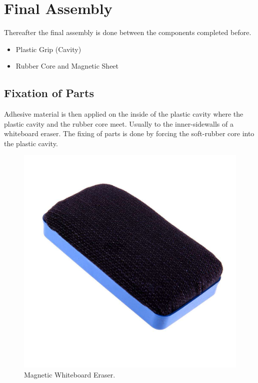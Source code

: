 \documentclass[12pt,a4paper,oneside]{article}
\begin{document}
\newpage

\section{Final Assembly}
Thereafter the final assembly is done between the components completed before.
\begin{itemize}
    \item Plastic Grip (Cavity)
    \item Rubber Core and Magnetic Sheet
\end{itemize}

\subsection{Fixation of Parts}

Adhesive material is then applied on the inside of the plastic cavity where the plastic cavity and the rubber core meet. Usually to the inner-sidewalls of a whiteboard eraser. The fixing of parts is done by forcing the soft-rubber core into the plastic cavity. 


\begin{figure}[h]
    \includegraphics[width=1\textwidth]{whiteboard-magnetic}
    \caption{Magnetic Whiteboard Eraser.}
\end{figure}
\newpage

\clearpage
{}
\printbibliography
\end{document}

